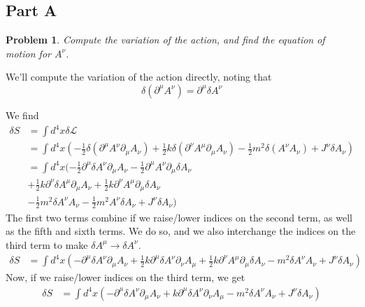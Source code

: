 \documentclass[fontsize=11pt]{scrartcl} %
\numberwithin{equation}{section} %
\numberwithin{figure}{section} %
\numberwithin{table}{section} %
\newtheorem*{problem}{Problem}
\begin{document}
\subsection*{Part A}
\begin{problem}
    Compute the variation of the action, and find the equation of motion for
    $A^{\nu}$.
\end{problem}

We'll compute the variation of the action directly, noting that
\[
    \delta(\partial^{\mu}A^{\nu}) = \partial^{\mu}\delta A^{\nu}
\]

We find
\[
    \begin{aligned}
        \delta S &= \int d^4x\delta\mathscr{L}\\
        &=\int d^4x
        (
            -\frac{1}{2}\delta(\partial^{\mu}A^{\nu}\partial_{\mu}A_{\nu})
            +\frac{1}{2}k\delta(\partial^{\nu}A^{\mu}\partial_{\mu}A_{\nu})
            -\frac{1}{2}m^2\delta(A^{\nu}A_{\nu}) + J^{\nu}\delta A_{\nu}
        )\\
        &=\int d^4x
        (
            -\frac{1}{2}\partial^{\mu}\delta A^{\nu}\partial_{\mu}A_{\nu}
            -\frac{1}{2}\partial^{\mu}A^{\nu}\partial_{\mu}\delta A_{\nu}\\
            &+\frac{1}{2}k\partial^{\nu}\delta A^{\mu}\partial_{\mu}A_{\nu}
            +\frac{1}{2}k\partial^{\nu}A^{\mu}\partial_{\mu}\delta A_{\nu}\\
            &-\frac{1}{2}m^2\delta A^{\nu}A_{\nu} - \frac{1}{2}m^2A^{\nu}\delta
            A_{\nu} + J^{\nu}\delta A_{\nu}
        )
    \end{aligned}
\]
The first two terms combine if we raise/lower indices on the second term, as
well as the fifth and sixth terms. We do so, and we also interchange the indices
on the third term to make $\delta A^{\mu}\to \delta A^{\nu}$.
\[
    \begin{aligned}
        \delta S
        &=\int d^4x
        (
            -\partial^{\mu}\delta A^{\nu}\partial_{\mu}A_{\nu}
            +\frac{1}{2}k\partial^{\mu}\delta A^{\nu}\partial_{\nu}A_{\mu}
            +\frac{1}{2}k\partial^{\nu}A^{\mu}\partial_{\mu}\delta A_{\nu}
            -m^2\delta A^{\nu}A_{\nu} + J^{\nu}\delta A_{\nu}
        )
    \end{aligned}
\]
Now, if we raise/lower indices on the third term, we get
\[
    \begin{aligned}
        \delta S
        &=\int d^4x
        (
            -\partial^{\mu}\delta A^{\nu}\partial_{\mu}A_{\nu}
            +k\partial^{\mu}\delta A^{\nu}\partial_{\nu}A_{\mu}
            -m^2\delta A^{\nu}A_{\nu} + J^{\nu}\delta A_{\nu}
        )
    \end{aligned}
\]
\end{document}
